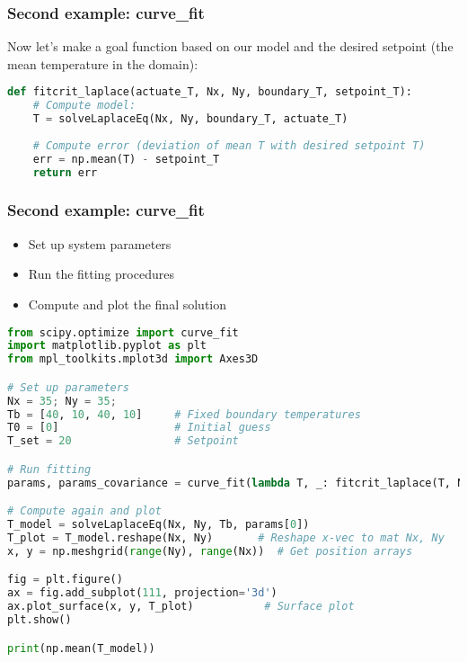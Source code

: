   \begin{frame}[fragile] 
    \frametitle{Second example: curve\_fit}
    Now let's make a goal function based on our model and the desired setpoint (the mean temperature in the domain):
    
    \begin{lstlisting}[language=Python]
def fitcrit_laplace(actuate_T, Nx, Ny, boundary_T, setpoint_T):
    # Compute model:
    T = solveLaplaceEq(Nx, Ny, boundary_T, actuate_T)
    
    # Compute error (deviation of mean T with desired setpoint T)
    err = np.mean(T) - setpoint_T
    return err
    \end{lstlisting}
  \end{frame}  

  \begin{frame}[fragile] 
    \frametitle{Second example: curve\_fit}
    \begin{itemize}
      \item Set up system parameters
      \item Run the fitting procedures
      \item Compute and plot the final solution
    \end{itemize}
    
    \begin{lstlisting}[language=Python,basicstyle=\tiny]
from scipy.optimize import curve_fit
import matplotlib.pyplot as plt
from mpl_toolkits.mplot3d import Axes3D

# Set up parameters
Nx = 35; Ny = 35;
Tb = [40, 10, 40, 10]     # Fixed boundary temperatures
T0 = [0]                  # Initial guess 
T_set = 20                # Setpoint

# Run fitting
params, params_covariance = curve_fit(lambda T, _: fitcrit_laplace(T, Nx, Ny, Tb, T_set), [0], [0], p0=T0)

# Compute again and plot
T_model = solveLaplaceEq(Nx, Ny, Tb, params[0])
T_plot = T_model.reshape(Nx, Ny)       # Reshape x-vec to mat Nx, Ny
x, y = np.meshgrid(range(Ny), range(Nx))  # Get position arrays

fig = plt.figure()
ax = fig.add_subplot(111, projection='3d')
ax.plot_surface(x, y, T_plot)           # Surface plot
plt.show()

print(np.mean(T_model))
    \end{lstlisting}
  \end{frame}
  




